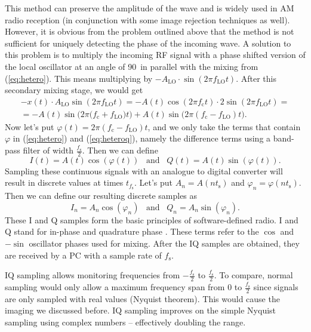 \documentclass[a4paper,12pt,twoside,openright]{report}
\begin{document}
This method can preserve the amplitude of the wave and is widely used in AM radio reception (in conjunction with some image rejection techniques as well). However, it is obvious from the problem outlined above that the method is not sufficient for uniquely detecting the phase of the incoming wave. A solution to this problem is to multiply the incoming RF signal with a phase shifted version of the local oscillator at an angle of 90\degree\ in parallel with the mixing from (\ref{eq:hetero}). This means multiplying by $-A_\text{LO} \cdot \sin(2 \pi f_\text{LO} t)$. After this secondary mixing stage, we would get
\begin{multline}
\label{eq:heteroq}
- x(t) \cdot A_\text{LO} \sin(2 \pi f_\text{LO} t) =  -A(t) \cos(2 \pi f_\text{c} t) \cdot 2 \sin(2 \pi f_\text{LO} t) = \\
=  - A(t) \sin\big( 2 \pi  (f_\text{c} + f_\text{LO} \big) t\big) + A(t) \sin\big( 2 \pi (f_\text{c} - f_\text{LO}) t \big) .
\end{multline}
Now let's put $\varphi(t) = 2 \pi (f_\text{c}-f_\text{LO}) t$, and we only take the terms that contain $\varphi$ in (\ref{eq:hetero}) and (\ref{eq:heteroq}), namely the difference terms using a band-pass filter of width $\frac{f_\text{s}}{2}$. Then we can define
\begin{equation}
I(t) = A(t) \cos( \varphi (t)) \,\,\,\,\, \text{and} \,\,\,\,\, Q(t) = A(t) \sin( \varphi (t)) .
\end{equation}
Sampling these continuous signals with an analogue to digital converter will result in discrete values at times $t_{f_\text{s}}$. Let's put $A_{n} = A(n t_\text{s})$ and $\varphi_{n} = \varphi(n t_\text{s})$. Then we can define our resulting discrete samples as
\begin{equation}
I_{n} = A_{n} \cos( \varphi_{n} ) \,\,\,\,\, \text{and} \,\,\,\,\, Q_{n} = A_{n} \sin( \varphi _{n}) .
\end{equation}
These I and Q samples form the basic principles of software-defined radio. I and Q stand for in-phase and quadrature phase \cite{kirkhorn1999introduction}. These terms refer to the $\cos$ and $-\sin$ oscillator phases used for mixing. After the IQ samples are obtained, they are received by a PC with a sample rate of $f_\text{s}$.

IQ sampling allows monitoring frequencies from $-\frac{f_\text{s}}{2}$ to $\frac{f_\text{s}}{2}$. To compare, normal sampling would only allow a maximum frequency span from $0$ to $\frac{f_\text{s}}{2}$ since signals are only sampled with real values (Nyquist theorem). This would cause the imaging we discussed before. IQ sampling improves on the simple Nyquist sampling using complex numbers -- effectively doubling the range.
\end{document}
